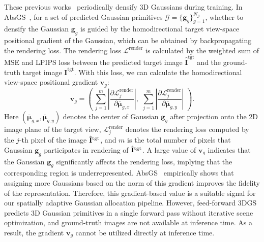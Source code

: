 These previous works~\cite{kerbl20233dgs, ye2024absgs} periodically densify 3D Gaussians during training. In AbsGS~\cite{ye2024absgs}, for a set of predicted Gaussian primitives $\mathcal{G}=\{{\mathbf{g}_g}\}^{N_\mathcal{G}}_{g=1}$, whether to densify the Gaussian $\mathbf{g}_g$ is guided by the homodirectional target view-space positional gradient of the Gaussian, which can be obtained by backpropagating the rendering loss. 
The rendering loss $\mathcal{L}^\text{render}$ is calculated by the weighted sum of MSE and LPIPS loss between the predicted target image $\hat{\mathbf{I}}^\text{tgt}$ and the ground-truth target image $\mathbf{I}^\text{tgt}$.
With this loss, we can calculate the homodirectional view-space positional gradient $\mathbf{v}_g$:
\begin{equation}
    \mathbf{v}_g = \left( \,\sum^{m}_{j=1}\left|\frac{\partial \mathcal{L}_j^\text{render}}{\partial  \bar{\boldsymbol{\mu}}_{g,x}}\right|,\,\, \sum^{m}_{j=1}\left|\frac{\partial \mathcal{L}_j^\text{render}}{\partial \bar{\boldsymbol{\mu}}_{g,y}}\right|\,\, \right).
\end{equation}
Here $(\bar{\boldsymbol{\mu}}_{g,x}, \bar{\boldsymbol{\mu}}_{g,y})$ denotes the center of Gaussian $\mathbf{g}_g$ after projection onto the 2D image plane of the target view, $\mathcal{L}_j^\text{render}$ denotes the rendering loss computed by the $j$-th pixel of the image $\hat{\mathbf{I}}^{\text{tgt}}$, and $m$ is the total number of pixels that Gaussian $\mathbf{g}_g$ participates in rendering of $\hat{\mathbf{I}}^{\text{tgt}}$.
A large value of $\mathbf{v}_g$ indicates that the Gaussian $\mathbf{g}_g$ significantly affects the rendering loss, implying that the corresponding region is underrepresented. AbsGS~\cite{ye2024absgs} empirically shows that assigning more Gaussians based on the norm of this gradient improves the fidelity of the representation. Therefore, this gradient-based value is a suitable signal for our spatially adaptive Gaussian allocation pipeline. However, feed-forward 3DGS predicts 3D Gaussian primitives in a single forward pass without iterative scene optimization, and ground-truth images are not available at inference time. As a result, the gradient $\mathbf{v}_g$ cannot be utilized directly at inference time. 


